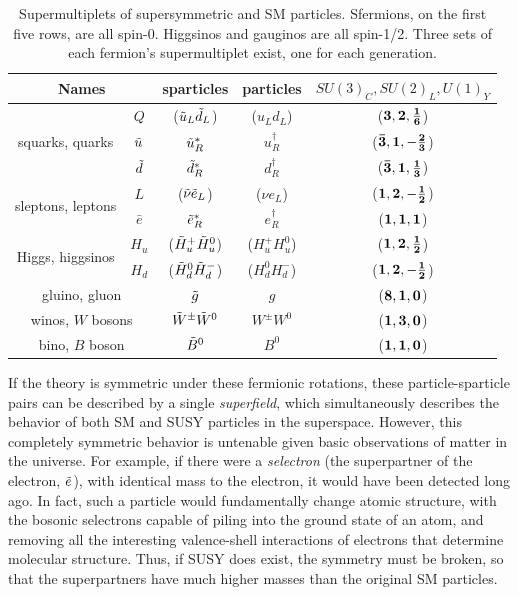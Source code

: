 \begin{table}
\begin{center}
 \begin{tabular}{cc|c|c|c}
   \hline 
   \multicolumn{2}{c|}{Names} & sparticles & particles & $SU(3)_C, SU(2)_L, U(1)_Y$ \\
   \hline
   \hline
   \multirow{3}{*}{squarks, quarks} & $Q$ 		& ($\squ[L] \sqd[L]$) & ($u_L d_L$) 		& ($\bf{3}, \bf{2}, \frac{1}{6}$) 		\\
   									& $\squ$ 	& $\squ[R]^*$ 		& $u^\dagger_R$ 	& ($\bf{\bar{3}}, \bf{1}, -\frac{2}{3}$) 	\\
   									& $\sqd$ 	& $\sqd[R]^*$ 		& $d^\dagger_R$ 	& ($\bf{\bar{3}}, \bf{1}, \frac{1}{3}$) 	\\		
   \hline
   \multirow{2}{*}{sleptons, leptons} & $L$ 	& ($\slneu \sle[L]$) & ($\nu e_L$) 		& ($\bf{1}, \bf{2}, -\frac{1}{2}$) 		\\
   									& $\bar{e}$ & $\sle[R]^*$ 		& $e^\dagger_R$ 	& ($\bf{1}, \bf{1}, 1$) 					\\
   \hline
   \multirow{2}{*}{Higgs, higgsinos} & $H_u$ 	& ($\Hou[+] \Hou[0]$) 	& ($H^+_u H^0_u$)  & ($\bf{1}, \bf{2}, \frac{1}{2}$) 	\\
   									& $H_d$ 	& ($\Hod[0] \Hod[-]$) 	& ($H^0_d H^-_d$)  & ($\bf{1}, \bf{2}, -\frac{1}{2}$) 	\\  
   \hline
   \multicolumn{2}{c|}{gluino, gluon}	& $\go$ 			& $g$			& ($\bf{8}, \bf{1}, 0$)		\\							
   \hline
   \multicolumn{2}{c|}{winos, $W$ bosons}	& $\Wo^\pm \Wo^0$ 	& $W^\pm W^0$	& ($\bf{1}, \bf{3}, 0$)		\\							
   \hline
   \multicolumn{2}{c|}{bino, $B$ boson}	& $\Bo^0$ 			& $B^0$			& ($\bf{1}, \bf{1}, 0$)		\\							

\hline
\hline
 \end{tabular}
\end{center}
 \caption{Supermultiplets of supersymmetric and \ac{SM} particles. Sfermions, on the first five rows, are all spin-0. Higgsinos and gauginos are all spin-1/2. Three sets of each fermion's supermultiplet exist, one for each generation. \cite{Martin:1997ns}}
 \label{tab:sparticles}
\end{table}

If the theory is symmetric under these fermionic rotations, these particle-sparticle pairs can be described by a single \textit{superfield}, which simultaneously describes the behavior of both \ac{SM} and \ac{SUSY} particles in the superspace. However, this completely symmetric behavior is untenable given basic observations of matter in the universe. For example, if there were a \textit{selectron} (the superpartner of the electron, $\sle$), with identical mass to the electron, it would have been detected long ago. In fact, such a particle would fundamentally change atomic structure, with the bosonic selectrons capable of piling into the ground state of an atom, and removing all the interesting valence-shell interactions of electrons that determine molecular structure. Thus, if \ac{SUSY} does exist, the symmetry must be broken, so that the superpartners have much higher masses than the original \ac{SM} particles. 

